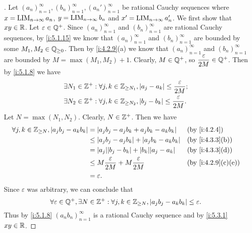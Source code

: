 \begin{proof}[]
  Let \((a_n)_{n = 1}^\infty, (b_n)_{n = 1}^\infty, (a_n')_{n = 1}^\infty\) be rational Cauchy sequences where \(x = \operatorname*{LIM}_{n \to \infty} a_n\), \(y = \operatorname*{LIM}_{n \to \infty} b_n\) and \(x' = \operatorname*{LIM}_{n \to \infty} a_n'\).
  We first show that \(xy \in \mathbb{R}\).
  Let \(\varepsilon \in \mathbb{Q}^+\).
  Since \((a_n)_{n = 1}^\infty\) and \((b_n)_{n = 1}^\infty\) are rational Cauchy sequences, by \cref{i:5.1.15} we know that \((a_n)_{n = 1}^\infty\) and \((b_n)_{n = 1}^\infty\) are bounded by some \(M_1, M_2 \in \mathbb{Q}_{\geq 0}\).
  Then by \cref{i:4.2.9}(a) we know that \((a_n)_{n = 1}^\infty\) and \((b_n)_{n = 1}^\infty\) are bounded by \(M = \max(M_1, M_2) + 1\).
  Clearly, \(M \in \mathbb{Q}^+\), so \(\dfrac{\varepsilon}{2M} \in \mathbb{Q}^+\).
  Then by \cref{i:5.1.8} we have
  \begin{align*}
     & \exists N_1 \in \mathbb{Z}^+ : \forall j, k \in \mathbb{Z}_{\geq N_1}, \left\lvert a_j - a_k\right\rvert \leq \dfrac{\varepsilon}{2M}; \\
     & \exists N_2 \in \mathbb{Z}^+ : \forall j, k \in \mathbb{Z}_{\geq N_2}, \left\lvert b_j - b_k\right\rvert \leq \dfrac{\varepsilon}{2M}.
  \end{align*}
  Let \(N = \max(N_1, N_2)\).
  Clearly, \(N \in \mathbb{Z}^+\).
  Then we have
  \begin{align*}
    \forall j, k \in \Z_{\geq N}, \abs{a_j b_j - a_k b_k} & = \abs{a_j b_j - a_j b_k + a_j b_k - a_k b_k}              &  & \by{i:4.2.4}      \\
                                                          & \leq \abs{a_j b_j - a_j b_k} + \abs{a_j b_k - a_k b_k}     &  & \by{i:4.3.3}[b]   \\
                                                          & = \abs{a_j} \abs{b_j - b_k} + \abs{b_k} \abs{a_j - a_k}    &  & \by{i:4.3.3}[d]   \\
                                                          & \leq M \dfrac{\varepsilon}{2M} + M \dfrac{\varepsilon}{2M} &  & \by{i:4.2.9}[c,e] \\
                                                          & = \varepsilon.
  \end{align*}
  Since \(\varepsilon\) was arbitrary, we can conclude that
  \[
    \forall \varepsilon \in \mathbb{Q}^+, \exists N \in \mathbb{Z}^+ : \forall j, k \in \mathbb{Z}_{\geq N}, \left\lvert a_j b_j - a_k b_k\right\rvert \leq \varepsilon.
  \]
  Thus by \cref{i:5.1.8} \((a_n b_n)_{n = 1}^\infty\) is a rational Cauchy sequence and by \cref{i:5.3.1} \(xy \in \mathbb{R}\).


\end{proof}
